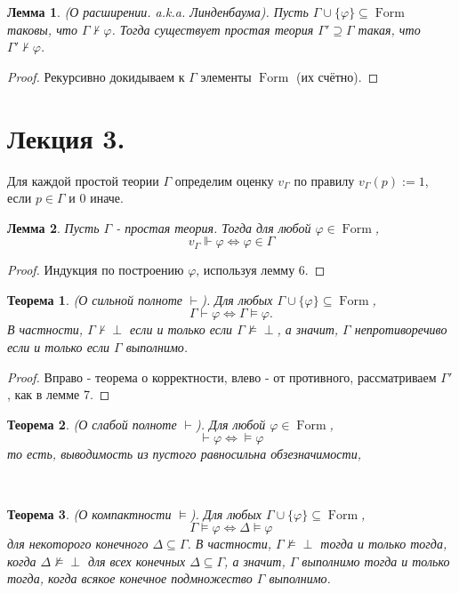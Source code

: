 \documentclass[a4paper,100pt]{article}
\theoremstyle{indented}
\newtheorem{theorem}{Теорема}
\newtheorem{lemma}{Лемма}
\theoremstyle{definition}
\theoremstyle{remark}
\DeclareMathOperator{\Llra}{\Longleftrightarrow}
\DeclareMathOperator{\form}{Form}
\begin{document}
\begin{lemma}
  (О расширении. a.k.a. Линденбаума). Пусть $\Gamma \cup \{\varphi \}\subseteq \form$ таковы, что $\Gamma \nvdash \varphi$. Тогда существует простая теория $\Gamma'\supseteq \Gamma$ такая, что $\Gamma' \nvdash \varphi$.
\end{lemma}

\begin{proof}
  Рекурсивно докидываем к $\Gamma$ элементы $\form$ (их счётно).
\end{proof}

\section{Лекция 3.}

Для каждой простой теории $\Gamma$ определим оценку $v_\Gamma$ по правилу $v_\Gamma(p):=1$, если $p\in \Gamma$ и 0 иначе. \\

\begin{lemma}
  Пусть $\Gamma$ - простая теория. Тогда для любой $\varphi \in \form$, 
  \[
    v_\Gamma \Vdash \varphi \Longleftrightarrow \varphi \in \Gamma
  \]
\end{lemma}

\begin{proof}
  Индукция по построению $\varphi$, используя лемму 6.
\end{proof}

\begin{theorem}
  (О сильной полноте $\vdash$). Для любых $\Gamma\cup \{\varphi\}\subseteq \form$, 
  \[
    \Gamma \vdash \varphi \Llra \Gamma \vDash \varphi. 
  \]
  В частности, $\Gamma \nvdash \perp$ если и только если $\Gamma \nvDash \perp$, а значит, $\Gamma$ непротиворечиво если и только если $\Gamma$ выполнимо.
\end{theorem}

\begin{proof}
  Вправо - теорема о корректности, влево - от противного, рассматриваем $\Gamma'$, как в лемме 7.
\end{proof}

\begin{theorem}
  (О слабой полноте $\vdash$). Для любой $\varphi \in \form$, 
  \[
    \vdash \varphi \Llra \vDash \varphi
  \]
  то есть, выводимость из пустого равносильна обзезначимости,
\end{theorem}\ 

\begin{theorem}
  (О компактности $\vDash$). Для любых $\Gamma \cup \{\varphi\}\subseteq \form$, 
  \[
    \Gamma \vDash \varphi \Llra \Delta \vDash \varphi
  \]
  для некоторого конечного $\Delta \subseteq \Gamma$. В частности, $\Gamma \nvDash \perp$ тогда и только тогда, когда $\Delta \nvDash \perp$ для всех конечных $\Delta \subseteq \Gamma$, а значит, $\Gamma$ выполнимо тогда и только тогда, когда всякое конечное подмножество $\Gamma $ выполнимо.
\end{theorem}
\end{document}
